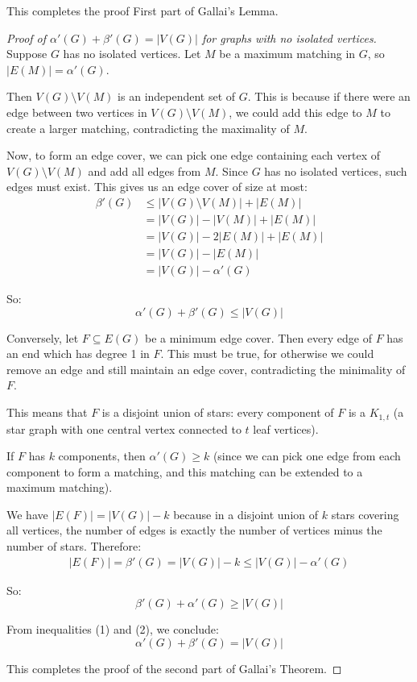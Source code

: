 \documentclass{article}
\theoremstyle{definition}
\begin{document}
This completes the proof First part of Gallai's Lemma.
\begin{proof}[Proof of $\alpha'(G) + \beta'(G) = |V(G)|$ for graphs with no isolated vertices]
Suppose $G$ has no isolated vertices. Let $M$ be a maximum matching in $G$, so $|E(M)| = \alpha'(G)$.

Then $V(G) \setminus V(M)$ is an independent set of $G$. This is because if there were an edge between two vertices in $V(G) \setminus V(M)$, we could add this edge to $M$ to create a larger matching, contradicting the maximality of $M$.

Now, to form an edge cover, we can pick one edge containing each vertex of $V(G) \setminus V(M)$ and add all edges from $M$. Since $G$ has no isolated vertices, such edges must exist. This gives us an edge cover of size at most:
\begin{align}
\beta'(G) &\leq |V(G) \setminus V(M)| + |E(M)| \\
&= |V(G)| - |V(M)| + |E(M)| \\
&= |V(G)| - 2|E(M)| + |E(M)| \\
&= |V(G)| - |E(M)| \\
&= |V(G)| - \alpha'(G)
\end{align}

So:
\begin{equation}
\alpha'(G) + \beta'(G) \leq |V(G)| \tag{1}
\end{equation}

Conversely, let $F \subseteq E(G)$ be a minimum edge cover. Then every edge of $F$ has an end which has degree 1 in $F$. This must be true, for otherwise we could remove an edge and still maintain an edge cover, contradicting the minimality of $F$.

This means that $F$ is a disjoint union of stars: every component of $F$ is a $K_{1,t}$ (a star graph with one central vertex connected to $t$ leaf vertices).

If $F$ has $k$ components, then $\alpha'(G) \geq k$ (since we can pick one edge from each component to form a matching, and this matching can be extended to a maximum matching).

We have $|E(F)| = |V(G)| - k$ because in a disjoint union of $k$ stars covering all vertices, the number of edges is exactly the number of vertices minus the number of stars. Therefore:
\begin{align}
|E(F)| = \beta'(G) = |V(G)| - k \leq |V(G)| - \alpha'(G)
\end{align}

So:
\begin{equation}
\beta'(G) + \alpha'(G) \geq |V(G)| \tag{2}
\end{equation}

From inequalities (1) and (2), we conclude:
\begin{equation}
\alpha'(G) + \beta'(G) = |V(G)|
\end{equation}

This completes the proof of the second part of Gallai's Theorem.
\end{proof}
\end{document}
